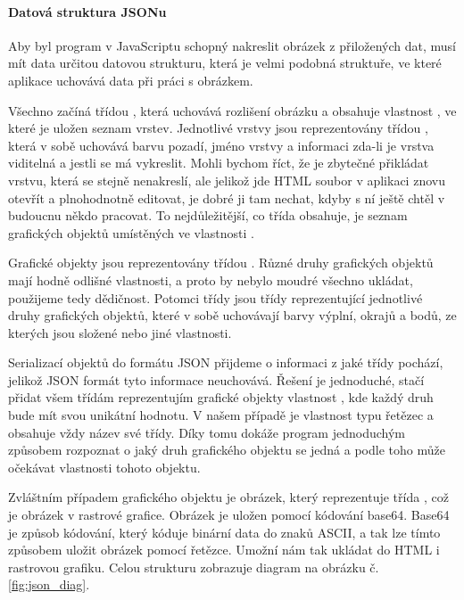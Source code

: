 \documentclass[
  field=inf,
  biblatex,
  glossaries,
  index
]{kidiplom}
\begin{document}
\paragraph{Datová struktura JSONu}
Aby byl program v JavaScriptu schopný nakreslit obrázek z přiložených dat, musí mít data určitou datovou strukturu, která je velmi podobná struktuře, ve které aplikace uchovává data při práci s obrázkem.

Všechno začíná třídou , která uchovává rozlišení obrázku a obsahuje vlastnost , ve které je uložen seznam vrstev. Jednotlivé vrstvy jsou reprezentovány třídou , která v sobě uchovává barvu pozadí, jméno vrstvy a informaci zda-li je vrstva viditelná a jestli se má vykreslit. Mohli bychom říct, že je zbytečné přikládat vrstvu, která se stejně nenakreslí, ale jelikož jde HTML soubor v aplikaci znovu otevřít a plnohodnotně editovat, je dobré ji tam nechat, kdyby s ní ještě chtěl v budoucnu někdo pracovat. To nejdůležitější, co třída  obsahuje, je seznam grafických objektů umístěných ve vlastnosti .

Grafické objekty jsou reprezentovány třídou . Různé druhy grafických objektů mají hodně odlišné vlastnosti, a proto by nebylo moudré všechno ukládat, použijeme tedy dědičnost. Potomci třídy  jsou třídy reprezentující jednotlivé druhy grafických objektů, které v sobě uchovávají barvy výplní, okrajů a bodů, ze kterých jsou složené nebo jiné vlastnosti.

Serializací objektů do formátu JSON přijdeme o informaci z jaké třídy pochází, jelikož JSON formát tyto informace neuchovává. Řešení je jednoduché, stačí přidat všem třídám reprezentujím grafické objekty vlastnost , kde každý druh bude mít svou unikátní hodnotu. V našem případě je vlastnost  typu řetězec a obsahuje vždy název své třídy. Díky tomu dokáže program jednoduchým způsobem rozpoznat o jaký druh grafického objektu se jedná a podle toho může očekávat vlastnosti tohoto objektu.

Zvláštním případem grafického objektu je obrázek, který reprezentuje třída , což je obrázek v rastrové grafice. Obrázek je uložen pomocí kódování base64. Base64 je způsob kódování, který kóduje binární data do znaků ASCII, a tak lze tímto způsobem uložit obrázek pomocí řetězce. Umožní nám tak ukládat do HTML i rastrovou grafiku. Celou strukturu zobrazuje diagram na obrázku č. \ref{fig:json_diag}.
\end{document}
